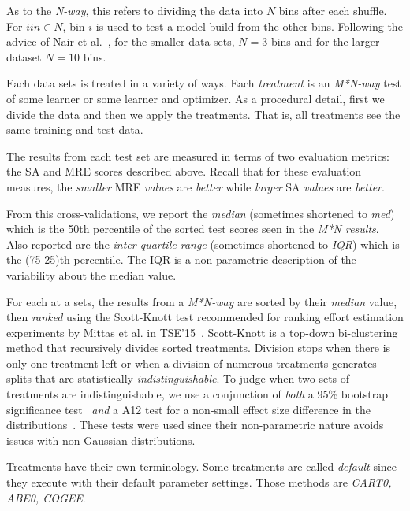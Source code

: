 \documentclass[10pt,conference]{IEEEtran}
\begin{document}
As to the {\em N-way}, this refers to dividing the data into $N$ bins after each shuffle.
For $i in \in N$, bin $i$ is used to test a model
build from the other bins.
Following the advice
of Nair et al.~\cite{nair18}, for the smaller data sets, $N=3$  bins
and for the larger dataset $N=10$ bins.   

Each data sets is treated in a variety of  ways. Each {\em treatment} is an {\em M*N-way} test of some learner or some learner and optimizer.
As a procedural detail, first we divide the data and then we apply the treatments. That is, all treatments see the same training and test data.

The results from each test set are measured in terms of two evaluation metrics: the SA and MRE scores described above. 
Recall that for these evaluation measures,  the {\em smaller} MRE {\em values} are {\em better}
while {\em larger} SA {\em values} are {\em better}.

From this cross-validations,
we  report the {\em median} (sometimes shortened to {\em med})
which is the 50th percentile of the sorted test scores seen in the {\em M*N results}.
Also reported are the  {\em inter-quartile range} (sometimes shortened to {\em IQR}) which is the (75-25)th percentile.
The IQR is a  non-parametric
description of the   variability about the median value.  

For each at a sets, the results from a {\em M*N-way} are sorted by their {\em  median} value, then {\em ranked} using the Scott-Knott test
recommended for ranking effort estimation experiments by Mittas et al. in TSE'15~\cite{Mittas13}. Scott-Knott is a top-down bi-clustering
method that recursively divides sorted treatments. Division stops when there is only one treatment left or when a division of numerous treatments generates 
splits that are statistically {\em indistinguishable}. 
To judge when two sets of treatments are indistinguishable, we use a conjunction of {\em both}  a 95\% bootstrap significance test~\cite{efron93} {\em and}
a A12 test for a non-small effect size difference in the distributions~\cite{MenziesNeg:2017}. These tests were used since their non-parametric nature avoids issues with non-Gaussian
distributions.  




Treatments have their own terminology.
 Some treatments are  called {\em default} since they execute with their
default parameter settings. Those methods are {\em CART0, ABE0, COGEE}.
\end{document}
